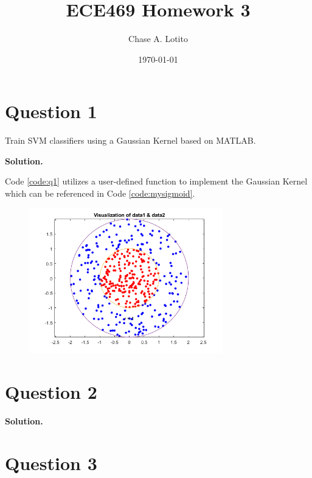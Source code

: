 \documentclass[11pt]{article}
\title{\textbf{ECE469 Homework 3}}
\author{Chase A. Lotito}
\date{\today}
\begin{document}

\maketitle

\section*{Question 1}

Train SVM classifiers using a Gaussian Kernel based on MATLAB.

\smallskip
\textbf{Solution.}



Code \ref{code:q1} utilizes a user-defined function to implement the Gaussian Kernel which can be referenced in Code \ref{code:mysigmoid}.


\begin{figure}[!h]
  \centering
  \includegraphics[width=0.75\textwidth]{../q1/data1_data2_visualization.png}
  \label{fig:q1_data_visual}
\end{figure}



\clearpage
\section*{Question 2}

\textbf{Solution.}





\clearpage
\section*{Question 3}
\end{document}
